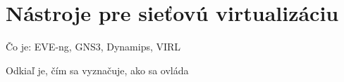 \chapter{Nástroje pre sieťovú virtualizáciu}

Čo je:
EVE-ng, GNS3, Dynamips, VIRL

Odkiaľ je, čím sa vyznačuje, ako sa ovláda